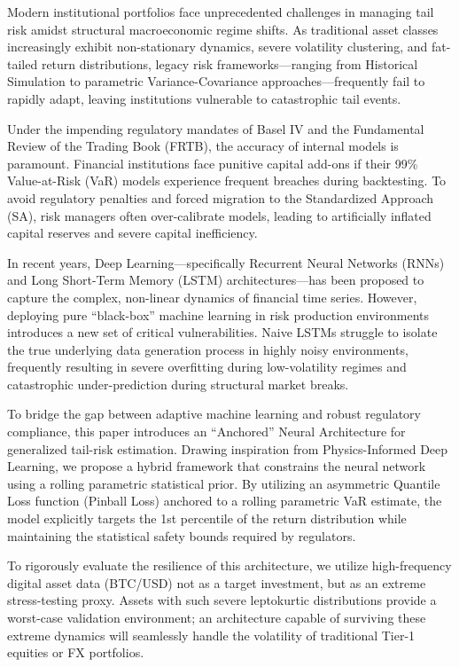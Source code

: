 
Modern institutional portfolios face unprecedented challenges in managing tail risk amidst structural macroeconomic regime shifts. As traditional asset classes increasingly exhibit non-stationary dynamics, severe volatility clustering, and fat-tailed return distributions, legacy risk frameworks---ranging from Historical Simulation to parametric Variance-Covariance approaches---frequently fail to rapidly adapt, leaving institutions vulnerable to catastrophic tail events.

Under the impending regulatory mandates of Basel IV and the Fundamental Review of the Trading Book (FRTB), the accuracy of internal models is paramount. Financial institutions face punitive capital add-ons if their 99\% Value-at-Risk (VaR) models experience frequent breaches during backtesting. To avoid regulatory penalties and forced migration to the Standardized Approach (SA), risk managers often over-calibrate models, leading to artificially inflated capital reserves and severe capital inefficiency. 

In recent years, Deep Learning---specifically Recurrent Neural Networks (RNNs) and Long Short-Term Memory (LSTM) architectures---has been proposed to capture the complex, non-linear dynamics of financial time series. However, deploying pure ``black-box'' machine learning in risk production environments introduces a new set of critical vulnerabilities. Naive LSTMs struggle to isolate the true underlying data generation process in highly noisy environments, frequently resulting in severe overfitting during low-volatility regimes and catastrophic under-prediction during structural market breaks.

To bridge the gap between adaptive machine learning and robust regulatory compliance, this paper introduces an ``Anchored'' Neural Architecture for generalized tail-risk estimation. Drawing inspiration from Physics-Informed Deep Learning, we propose a hybrid framework that constrains the neural network using a rolling parametric statistical prior. By utilizing an asymmetric Quantile Loss function (Pinball Loss) anchored to a rolling parametric VaR estimate, the model explicitly targets the 1st percentile of the return distribution while maintaining the statistical safety bounds required by regulators.

To rigorously evaluate the resilience of this architecture, we utilize high-frequency digital asset data (BTC/USD) not as a target investment, but as an extreme stress-testing proxy. Assets with such severe leptokurtic distributions provide a worst-case validation environment; an architecture capable of surviving these extreme dynamics will seamlessly handle the volatility of traditional Tier-1 equities or FX portfolios.

